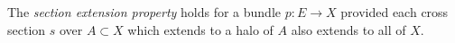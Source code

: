 The \textit{section extension property} holds for a bundle $p \colon E \to X$ provided each cross section $s$ over $A \subset X$ which extends to a halo of $A$ also extends to all of $X$.
